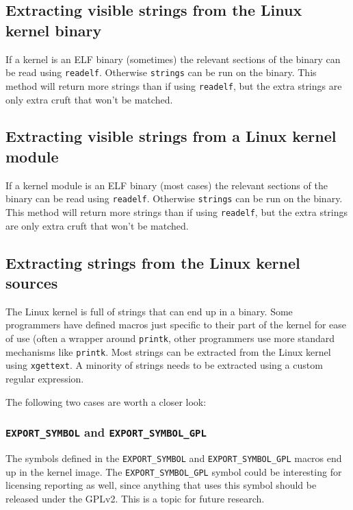 \documentclass[10pt]{article}
\begin{document}
\subsection{Extracting visible strings from the Linux kernel binary}

If a kernel is an ELF binary (sometimes) the relevant sections of the
binary can be read using \texttt{readelf}. Otherwise \texttt{strings} can be
run on the binary. This method will return more strings than if using
\texttt{readelf}, but the extra strings are only extra cruft that won't be
matched.

\subsection{Extracting visible strings from a Linux kernel module}

If a kernel module is an ELF binary (most cases) the relevant sections of the
binary can be read using \texttt{readelf}. Otherwise \texttt{strings} can be
run on the binary. This method will return more strings than if using
\texttt{readelf}, but the extra strings are only extra cruft that won't be
matched.

\subsection{Extracting strings from the Linux kernel sources}

The Linux kernel is full of strings that can end up in a binary. Some
programmers have defined macros just specific to their part of the kernel for
ease of use (often a wrapper around \texttt{printk}, other programmers use
more standard mechanisms like \texttt{printk}. Most strings can be extracted
from the Linux kernel using \texttt{xgettext}. A minority of strings needs to
be extracted using a custom regular expression.

The following two cases are worth a closer look:

\subsubsection{\texttt{EXPORT\_SYMBOL} and \texttt{EXPORT\_SYMBOL\_GPL}}

The symbols defined in the \texttt{EXPORT\_SYMBOL} and
\texttt{EXPORT\_SYMBOL\_GPL} macros end up in the kernel image. The
\texttt{EXPORT\_SYMBOL\_GPL} symbol could be interesting for licensing
reporting as well, since anything that uses this symbol should be released
under the GPLv2. This is a topic for future research.
\end{document}
